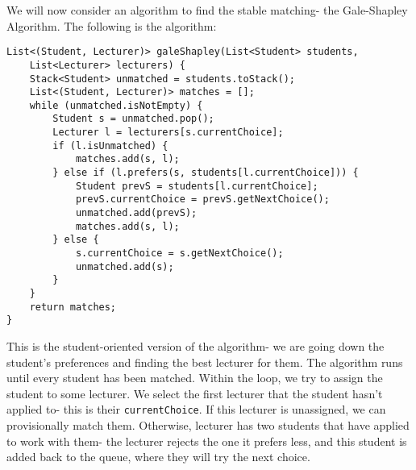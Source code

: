 \documentclass[a4paper, openany]{memoir}
\begin{document}
    We will now consider an algorithm to find the stable matching- the Gale-Shapley Algorithm. The following is the algorithm:
\begin{lstlisting}[language=pseudocode]
List<(Student, Lecturer)> galeShapley(List<Student> students, 
    List<Lecturer> lecturers) {
    Stack<Student> unmatched = students.toStack();
    List<(Student, Lecturer)> matches = [];
    while (unmatched.isNotEmpty) {
        Student s = unmatched.pop();
        Lecturer l = lecturers[s.currentChoice];
        if (l.isUnmatched) {
            matches.add(s, l);
        } else if (l.prefers(s, students[l.currentChoice])) {
            Student prevS = students[l.currentChoice];
            prevS.currentChoice = prevS.getNextChoice();
            unmatched.add(prevS);
            matches.add(s, l);
        } else {
            s.currentChoice = s.getNextChoice();
            unmatched.add(s);
        }
    }
    return matches;
}
\end{lstlisting}
    \noindent This is the student-oriented version of the algorithm- we are going down the student's preferences and finding the best lecturer for them. The algorithm runs until every student has been matched. Within the loop, we try to assign the student to some lecturer. We select the first lecturer that the student hasn't applied to- this is their \texttt{currentChoice}. If this lecturer is unassigned, we can provisionally match them. Otherwise, lecturer has two students that have applied to work with them- the lecturer rejects the one it prefers less, and this student is added back to the queue, where they will try the next choice. 
    
\end{document}
